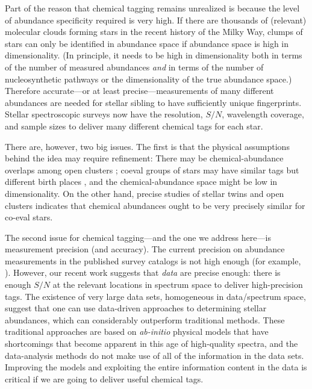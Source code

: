 \documentclass[12pt, letterpaper, preprint]{aastex}
\newcommand{\foreign}[1]{\textsl{#1}}
\begin{document}
Part of the reason that chemical tagging remains unrealized
is because the level of abundance specificity required
is very high.
If there are thousands of (relevant) molecular clouds forming stars in
the recent history of the Milky Way, clumps of stars can only be
identified in abundance space if abundance space is high in dimensionality.
(In principle, it needs to be high in dimensionality both in terms
of the number of measured abundances \emph{and} in terms of the number of
nucleosynthetic pathways or the dimensionality of the true abundance
space.)
Therefore accurate---or at
least precise---measurements of many different abundances are needed
for stellar sibling to have sufficiently unique fingerprints.
Stellar spectroscopic surveys now have the resolution,
$S/N$, wavelength coverage, and sample sizes to deliver many
different chemical tags for each star.

There are, however, two big issues.
The first is that the physical assumptions behind the idea may require
refinement:
There may be chemical-abundance overlaps among open clusters
\citep{blancocuaresma}; coeval groups of stars may have similar tags
but different birth places \citep{mitschang}, and the
chemical-abundance space might be low in dimensionality.
On the other hand, precise studies of stellar twins \citep{melendez, jofre}
and open clusters \citep{bovy} indicates that chemical abundances ought to be
very precisely similar for co-eval stars.

The second issue for chemical tagging---and the one we address
here---is measurement precision (and accuracy).
The current precision on abundance measurements in the published
survey catalogs is not high enough (for example, \citealt{martell,
  ting}).
However, our recent work \citep{thecannon} suggests that \emph{data}
are precise enough: there is enough $S/N$ at the relevant
locations in spectrum space to deliver high-precision tags.
The existence of very large data sets, homogeneous in data/spectrum
space, suggest that one can use data-driven approaches to determining
stellar abundances, which can considerably outperform traditional
methods.
These traditional approaches are based on \foreign{ab-initio} physical models
that have shortcomings that become apparent in this age of
high-quality spectra, and the data-analysis methods do not make use of
all of the information in the data sets.
Improving the models and exploiting the entire information
content in the data is critical if we are going to deliver useful
chemical tags.
\end{document}
